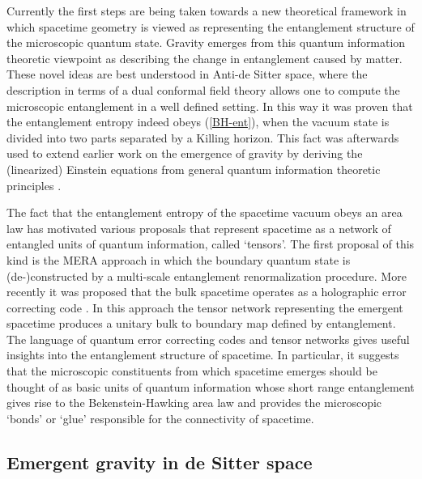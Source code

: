 \documentclass[a4paper,12pt]{article}
\begin{document}
Currently the first steps are being taken towards a new theoretical framework 
in which spacetime geometry is viewed as representing the entanglement 
structure of the microscopic quantum state. Gravity emerges from 
this quantum information theoretic viewpoint as describing the change in  
entanglement caused by matter. These novel ideas are best understood in Anti-de Sitter space,
where the description in terms of a dual conformal field theory allows one to 
compute the microscopic entanglement in a well 
defined setting. In this way it was proven \cite{CasiniMyers, 
MaldaLewko} that the entanglement entropy indeed obeys (\ref{BH-ent}), when the vacuum state is divided into two parts separated by a 
Killing horizon. This fact was afterwards used to extend earlier work on the emergence of gravity \cite{Jacobson, Padma,MyNewtonPaper} by deriving the (linearized) Einstein equations from general quantum information theoretic principles \cite{Raamsdonketal, Swingle-vR, Jacobson2}.  


The fact that the entanglement entropy of the spacetime 
 vacuum obeys an area law has motivated various proposals that represent spacetime 
 as a network of entangled units of quantum information, called `tensors'. The 
first proposal of this kind is the MERA approach 
\cite{MERA, Swingle-Mera} in which the boundary quantum state is (de-)constructed 
by a multi-scale entanglement renormalization procedure. More recently it was proposed that the bulk spacetime operates as a holographic error correcting code 
\cite{HarlowPreskill, Haydenetal}. In this approach the tensor network representing the emergent spacetime produces a unitary bulk to boundary map defined by entanglement.  The language of quantum error correcting codes and tensor networks gives useful insights into the entanglement structure of spacetime. In particular, it suggests that the microscopic constituents from which spacetime emerges should be thought of as basic units of quantum information whose short range entanglement gives rise to the Bekenstein-Hawking area law and provides the microscopic `bonds' or `glue' responsible for the connectivity of spacetime.  %


\subsection{Emergent gravity in de Sitter space}
\end{document}
